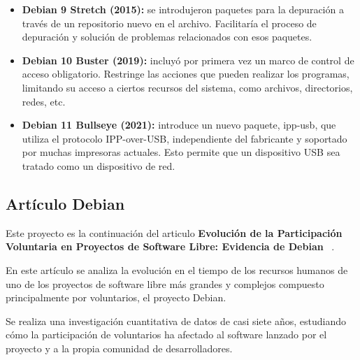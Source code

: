 \documentclass[a4paper, 12pt]{book}
\begin{document}
\begin{itemize}
	\item \textbf {Debian 9 Stretch (2015):} se introdujeron paquetes para la depuración a través de un repositorio nuevo en el archivo. Facilitaría el proceso de depuración y solución de problemas relacionados con esos paquetes.
	\item \textbf {Debian 10 Buster (2019):} incluyó por primera vez un marco de control de acceso obligatorio. Restringe las acciones que pueden realizar los programas, limitando su acceso a ciertos recursos del sistema, como archivos, directorios, redes, etc.
	\item \textbf {Debian 11 Bullseye (2021):} introduce un nuevo paquete, ipp-usb, que utiliza el protocolo IPP-over-USB, independiente del fabricante y soportado por muchas impresoras actuales. Esto permite que un dispositivo USB sea tratado como un dispositivo de red.
	
		
\end{itemize}
	
\subsection{Artículo Debian}
\label{subsec:articulo debian}

Este proyecto es la continuación del articulo \textbf {Evolución de la Participación Voluntaria en Proyectos de Software Libre:
Evidencia de Debian} ~\cite{robles05:_debian}.

En este 
artículo se analiza la evolución en el tiempo de los recursos humanos de 
uno de los proyectos de software libre más grandes y complejos 
compuesto principalmente por voluntarios, el proyecto Debian.

Se realiza una investigación 
cuantitativa de datos de casi siete años, estudiando cómo la participación 
de voluntarios ha afectado al software lanzado por el proyecto y a la 
propia comunidad de desarrolladores.
\end{document}
